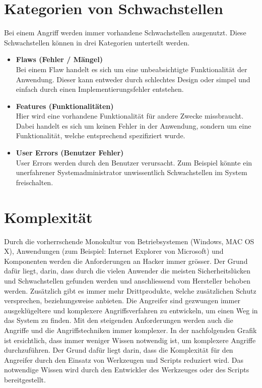 \section{Kategorien von Schwachstellen}
Bei einem Angriff werden immer vorhandene Schwachstellen ausgenutzt. Diese Schwachstellen können in drei Kategorien unterteilt werden.

\begin{itemize}
\item \textbf{Flaws (Fehler / Mängel)} \\
Bei einem Flaw handelt es sich um eine unbeabsichtigte Funktionalität der Anwendung. Dieser kann entweder durch schlechtes Design oder simpel und einfach durch einen Implementierungsfehler entstehen.
\item \textbf{Features (Funktionalitäten)} \\
Hier wird eine vorhandene Funktionalität für andere Zwecke missbraucht. Dabei handelt es sich um keinen Fehler in der Anwendung, sondern um eine Funktionalität, welche entsprechend spezifiziert wurde.
\item \textbf{User Errors (Benutzer Fehler)} \\
User Errors werden durch den Benutzer verursacht. Zum Beispiel könnte ein unerfahrener Systemadministrator unwissentlich Schwachstellen im System freischalten.
\end{itemize}


\section{Komplexität}
Durch die vorherrschende Monokultur von Betriebsystemen (Windows, MAC OS X), Anwendungen (zum Beispiel: Internet Explorer von Microsoft) und Komponenten werden die Anforderungen an Hacker immer grösser. Der Grund dafür liegt, darin, dass durch die vielen Anwender die meisten Sicherheitslücken und Schwachstellen gefunden werden und anschliessend vom Hersteller behoben werden. Zusätzlich gibt es immer mehr Drittprodukte, welche zusätzlichen Schutz versprechen, beziehungsweise anbieten. Die Angreifer sind gezwungen immer ausgeklügeltere und komplexere Angriffsverfahren zu entwickeln, um einen Weg in das System zu finden. Mit den steigenden Anforderungen werden auch die Angriffe und die Angriffstechniken immer komplexer. In der nachfolgenden Grafik ist ersichtlich, dass immer weniger Wissen notwendig ist, um komplexere Angriffe durchzuführen. Der Grund dafür liegt darin, dass die Komplexität für den Angreifer durch den Einsatz von Werkzeugen und Scripts reduziert wird. Das notwendige Wissen wird durch den Entwickler des Werkzeuges oder des Scripts bereitgestellt.

